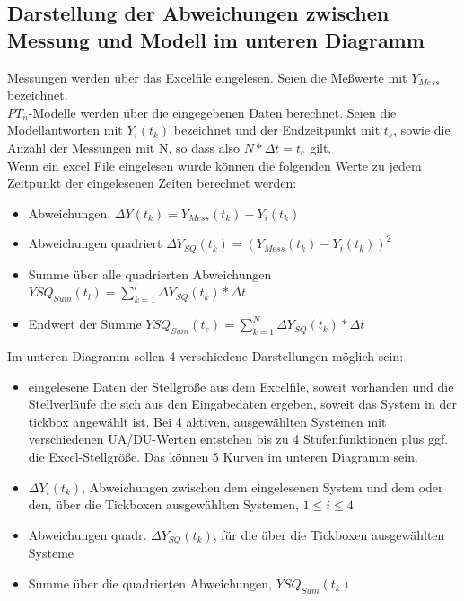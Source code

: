 \documentclass[main.tex]{subfiles}
\begin{document}
\subsection{Darstellung der Abweichungen zwischen Messung und Modell im unteren Diagramm}
Messungen werden über das Excelfile eingelesen. Seien die Meßwerte mit $Y_{Mess}$ bezeichnet.\\ %
$PT_n$-Modelle werden über die eingegebenen Daten berechnet.  Seien die Modellantworten mit $Y_i(t_k)$ bezeichnet und der Endzeitpunkt  mit $t_e$, sowie die Anzahl der 
Messungen mit N, so dass also $N*\Delta t= t_e$ gilt.\\
Wenn ein excel File eingelesen wurde können die folgenden Werte zu jedem Zeitpunkt der eingelesenen Zeiten berechnet werden:
\begin{itemize}
    \item Abweichungen, $\Delta Y(t_k) = Y_{Mess}(t_k)-Y_i(t_k)$  %
    \item Abweichungen quadriert $\Delta Y_{SQ}(t_k)=(Y_{Mess}(t_k)-Y_i(t_k))^2$
    \item Summe über alle quadrierten Abweichungen $YSQ_{Sum}(t_l)=\sum_{k=1}^{l} \Delta Y_{SQ}(t_k)* \Delta t$ %
    \item Endwert der Summe $YSQ_{Sum}(t_e)=\sum_{k=1}^{N} \Delta Y_{SQ}(t_k)* \Delta t$
\end{itemize}
Im unteren Diagramm sollen 4 verschiedene Darstellungen möglich sein:\\
\begin{itemize}
    \item eingelesene Daten der Stellgröße aus dem Excelfile, soweit vorhanden und die Stellverläufe die sich aus den Eingabedaten ergeben, soweit das System in der tickbox angewählt ist. Bei 4 aktiven, ausgewählten Systemen mit verschiedenen UA/DU-Werten entstehen bis zu 4 Stufenfunktionen plus ggf. die Excel-Stellgröße. Das können 5 Kurven im unteren Diagramm sein. %
    \item $\Delta Y_i(t_k)$, Abweichungen zwischen dem eingelesenen System und dem oder den, über die Tickboxen ausgewählten Systemen, $1 \le i \le 4$
    \item Abweichungen quadr. $\Delta Y_{SQ}(t_k)$, für die über die Tickboxen ausgewählten Systeme
    \item Summe über die quadrierten Abweichungen, $YSQ_{Sum}(t_k)$
    
\end{itemize}
\end{document}
